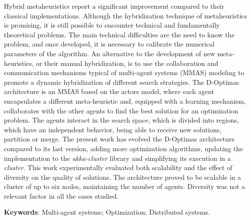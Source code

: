 \begin{resumo}[Abstract]
Hybrid metaheuristics report a significant improvement compared to their classical implementations. Although the hybridization technique of metaheuristics is promising, it is still possible to encounter technical and fundamentally theoretical problems. The main technical difficulties are the need to know the problem, and once developed, it is necessary to calibrate the numerical parameters of the algorithm. An alternative to the development of new meta-heuristics, or their manual hybridization, is to use the collaboration and communication mechanisms typical of multi-agent systems (MMAS) modeling to promote a dynamic hybridization of different search strategies. The D-Optimas architecture is an MMAS based on the actors model, where each agent encapsulates a different meta-heuristic and, equipped with a learning mechanism, collaborates with the other agents to find the best solution for an optimization problem. The agents interact in the search space, which is divided into regions, which have an independent behavior, being able to receive new solutions, partition or merge. The present work has evolved the D-Optimas architecture compared to its last version, adding more optimization algorithms, updating the implementation to the \textit{akka-cluster} library and simplifying its execution in a \textit{cluster}. This work experimentally evaluated both scalability and the effect of diversity on the quality of solutions. The architecture proved to be scalable in a cluster of up to six nodes, maintaining the number of agents. Diversity was not a relevant factor in all the cases studied.


\textbf{Keywords}: Multi-agent systems; Optimization; Distributed systems.
\end{resumo}